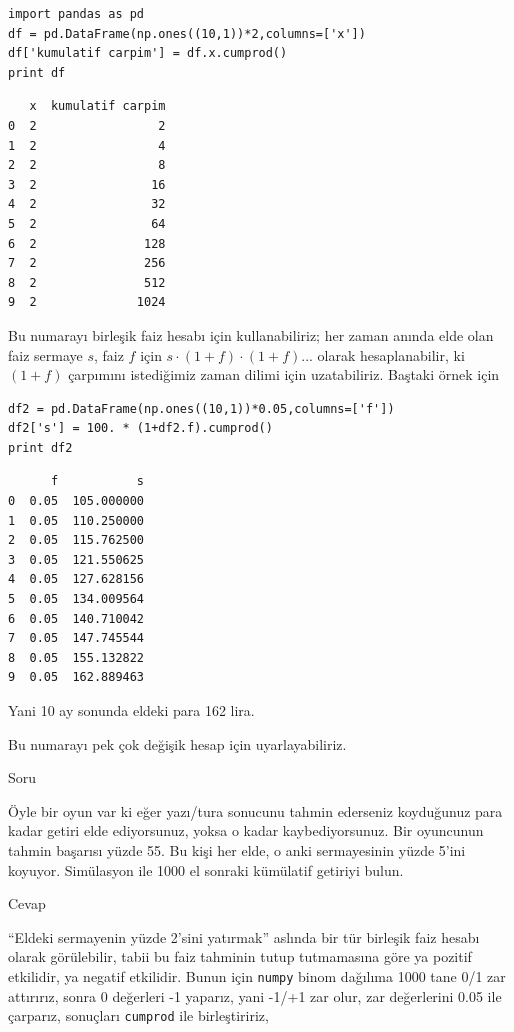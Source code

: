 \documentclass[12pt,fleqn]{article}\usepackage{../../common}
\begin{document}
\begin{verbatim}
import pandas as pd
df = pd.DataFrame(np.ones((10,1))*2,columns=['x'])
df['kumulatif carpim'] = df.x.cumprod()
print df
\end{verbatim}

\begin{verbatim}
   x  kumulatif carpim
0  2                 2
1  2                 4
2  2                 8
3  2                16
4  2                32
5  2                64
6  2               128
7  2               256
8  2               512
9  2              1024
\end{verbatim}

Bu numarayı birleşik faiz hesabı için kullanabiliriz; her zaman anında elde
olan faiz sermaye $s$, faiz $f$ için $s \cdot (1+f) \cdot (1+f) ...$
olarak hesaplanabilir, ki $(1+f)$ çarpımını istediğimiz zaman dilimi için
uzatabiliriz. Baştaki örnek için 

\begin{verbatim}
df2 = pd.DataFrame(np.ones((10,1))*0.05,columns=['f'])
df2['s'] = 100. * (1+df2.f).cumprod()
print df2
\end{verbatim}

\begin{verbatim}
      f           s
0  0.05  105.000000
1  0.05  110.250000
2  0.05  115.762500
3  0.05  121.550625
4  0.05  127.628156
5  0.05  134.009564
6  0.05  140.710042
7  0.05  147.745544
8  0.05  155.132822
9  0.05  162.889463
\end{verbatim}

Yani 10 ay sonunda eldeki para 162 lira. 

Bu numarayı pek çok değişik hesap için uyarlayabiliriz. 

Soru

Öyle bir oyun var ki eğer yazı/tura sonucunu tahmin ederseniz koyduğunuz
para kadar getiri elde ediyorsunuz, yoksa o kadar kaybediyorsunuz. Bir
oyuncunun tahmin başarısı yüzde 55. Bu kişi her elde, o anki sermayesinin
yüzde 5'ini koyuyor. Simülasyon ile 1000 el sonraki kümülatif getiriyi
bulun.

Cevap

``Eldeki sermayenin yüzde 2'sini yatırmak'' aslında bir tür birleşik faiz
hesabı olarak görülebilir, tabii bu faiz tahminin tutup tutmamasına göre ya
pozitif etkilidir, ya negatif etkilidir. Bunun için \verb!numpy!  binom
dağılıma 1000 tane 0/1 zar attırırız, sonra 0 değerleri -1 yaparız, yani
-1/+1 zar olur, zar değerlerini 0.05 ile çarparız, sonuçları \verb!cumprod!
ile birleştiririz,
\end{document}
